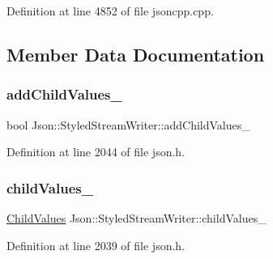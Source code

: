 Definition at line 4852 of file jsoncpp.\+cpp.



\subsection{Member Data Documentation}
\hypertarget{class_json_1_1_styled_stream_writer_a4e4bb7fc223b2652b72b523b1ce414fa}{}\label{class_json_1_1_styled_stream_writer_a4e4bb7fc223b2652b72b523b1ce414fa} 
\subsubsection{\texorpdfstring{add\+Child\+Values\+\_\+}{addChildValues\_}}
{\footnotesize\ttfamily bool Json\+::\+Styled\+Stream\+Writer\+::add\+Child\+Values\+\_\+\hspace{0.3cm}{\ttfamily [private]}}



Definition at line 2044 of file json.\+h.

\hypertarget{class_json_1_1_styled_stream_writer_aafd62e00a401df73fcacb2e410114b3d}{}\label{class_json_1_1_styled_stream_writer_aafd62e00a401df73fcacb2e410114b3d} 
\subsubsection{\texorpdfstring{child\+Values\+\_\+}{childValues\_}}
{\footnotesize\ttfamily \hyperlink{class_json_1_1_styled_stream_writer_a259bf9d99847b2ea64ec9c6dd441944e}{Child\+Values} Json\+::\+Styled\+Stream\+Writer\+::child\+Values\+\_\+\hspace{0.3cm}{\ttfamily [private]}}



Definition at line 2039 of file json.\+h.

\hypertarget{class_json_1_1_styled_stream_writer_abd23dff69bc8ef37a81d190173d4b88e}{}\label{class_json_1_1_styled_stream_writer_abd23dff69bc8ef37a81d190173d4b88e} 
